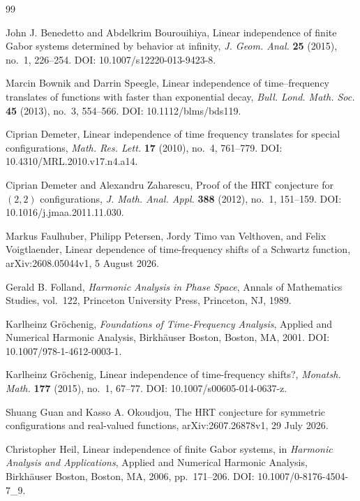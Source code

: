 \documentclass[11pt]{amsart}
\theoremstyle{remark}
\begin{document}
\begin{thebibliography}{99}

John J. Benedetto and Abdelkrim Bourouihiya,
\newblock Linear independence of finite Gabor systems determined by behavior
at infinity,
\newblock \emph{J. Geom. Anal.} \textbf{25} (2015), no.~1, 226--254.
\newblock DOI: 10.1007/s12220-013-9423-8.

Marcin Bownik and Darrin Speegle,
\newblock Linear independence of time--frequency translates of functions with
faster than exponential decay,
\newblock \emph{Bull. Lond. Math. Soc.} \textbf{45} (2013), no.~3, 554--566.
\newblock DOI: 10.1112/blms/bds119.

Ciprian Demeter,
\newblock Linear independence of time frequency translates for special
configurations,
\newblock \emph{Math. Res. Lett.} \textbf{17} (2010), no.~4, 761--779.
\newblock DOI: 10.4310/MRL.2010.v17.n4.a14.

Ciprian Demeter and Alexandru Zaharescu,
\newblock Proof of the HRT conjecture for $(2,2)$ configurations,
\newblock \emph{J. Math. Anal. Appl.} \textbf{388} (2012), no.~1, 151--159.
\newblock DOI: 10.1016/j.jmaa.2011.11.030.

Markus Faulhuber, Philipp Petersen, Jordy Timo van Velthoven, and Felix
Voigtlaender,
\newblock Linear dependence of time-frequency shifts of a Schwartz function,
\newblock arXiv:2608.05044v1, 5 August 2026.

Gerald B. Folland,
\newblock \emph{Harmonic Analysis in Phase Space},
\newblock Annals of Mathematics Studies, vol.~122, Princeton University Press,
Princeton, NJ, 1989.

Karlheinz Gr\"ochenig,
\newblock \emph{Foundations of Time-Frequency Analysis},
\newblock Applied and Numerical Harmonic Analysis, Birkh\"auser Boston,
Boston, MA, 2001.
\newblock DOI: 10.1007/978-1-4612-0003-1.

Karlheinz Gr\"ochenig,
\newblock Linear independence of time-frequency shifts?,
\newblock \emph{Monatsh. Math.} \textbf{177} (2015), no.~1, 67--77.
\newblock DOI: 10.1007/s00605-014-0637-z.

Shuang Guan and Kasso A. Okoudjou,
\newblock The HRT conjecture for symmetric configurations and real-valued
functions,
\newblock arXiv:2607.26878v1, 29 July 2026.

Christopher Heil,
\newblock Linear independence of finite Gabor systems,
\newblock in \emph{Harmonic Analysis and Applications}, Applied and Numerical
Harmonic Analysis, Birkh\"auser Boston, Boston, MA, 2006, pp.~171--206.
\newblock DOI: 10.1007/0-8176-4504-7\_9.


\end{thebibliography}
\end{document}
